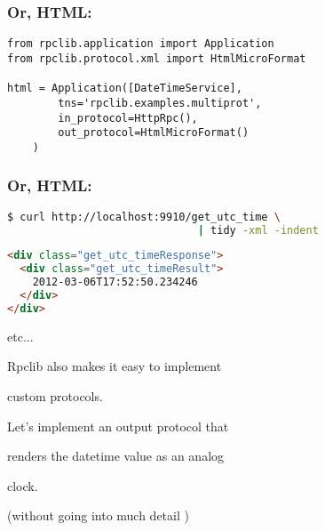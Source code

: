 \documentclass{beamer}
\begin{document}
\begin{frame}[fragile]
  \frametitle{Or, HTML:}

  \begin{lstlisting}
from rpclib.application import Application
from rpclib.protocol.xml import HtmlMicroFormat

html = Application([DateTimeService],
        tns='rpclib.examples.multiprot',
        in_protocol=HttpRpc(),
        out_protocol=HtmlMicroFormat()
    )
  \end{lstlisting}
\end{frame}


\begin{frame}[fragile]
  \frametitle{Or, HTML:}

  \begin{lstlisting}[language=sh,frame=topline]
$ curl http://localhost:9910/get_utc_time \
                              | tidy -xml -indent
  \end{lstlisting}
  \begin{lstlisting}[language=html, frame=bottomline]
<div class="get_utc_timeResponse">
  <div class="get_utc_timeResult">
    2012-03-06T17:52:50.234246
  </div>
</div>
  \end{lstlisting}
\end{frame}


\begin{frame}
  \LARGE
  \begin{center}
    etc...
  \end{center}
\end{frame}

\begin{frame}
  \LARGE
  \begin{center}
    Rpclib also makes it easy to implement

    \bigskip

    custom protocols.
  \end{center}
\end{frame}

\begin{frame}
  \LARGE
  \begin{center}
    Let's implement an output protocol that

    \bigskip

    renders the datetime value as an analog

    \bigskip

    clock.

    \bigskip
    \large
    (without going into much detail \smiley)

  \end{center}
\end{frame}
\end{document}
